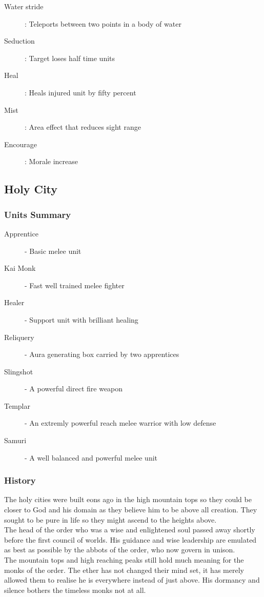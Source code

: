 \documentclass[a4paper]{article}
\begin{document}
\begin{description}
\item[Water stride]: Teleports between two points in a body of water
\item[Seduction]: Target loses half time units
\item[Heal]: Heals injured unit by fifty percent
\item[Mist]: Area effect that reduces sight range
\item[Encourage]: Morale increase
\end{description}

\subsection{Holy City}

\subsubsection{Units Summary}

\begin{description}
\item[Apprentice] - Basic melee unit
\item[Kai Monk] - Fast well trained melee fighter
\item[Healer] - Support unit with brilliant healing
\item[Reliquery] - Aura generating box carried by two apprentices
\item[Slingshot] - A powerful direct fire weapon

\item[Templar] - An extremly powerful reach melee warrior with low defense
\item[Samuri] - A well balanced and powerful melee unit
\end{description}

\subsubsection{History}

The holy cities were built eons ago in the high mountain tops so they could be closer to God and his domain as they believe him to be above all creation. They sought to be pure in life so they might ascend to the heights above.\\
The head of the order who was a wise and enlightened soul passed away shortly before the first council of worlds. His guidance and wise leadership are emulated as best as possible by the abbots of the order, who now govern in unison.\\
The mountain tops and high reaching peaks still hold much meaning for the monks of the order. The ether has not changed their mind set, it has merely allowed them to realise he is everywhere instead of just above. His dormancy and silence bothers the timeless monks not at all.
\end{document}
